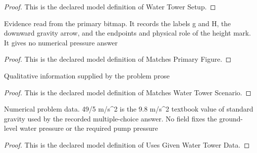 \begin{proof}
  This is the declared model definition of Water Tower Setup.
\end{proof}
\begin{definition}
  \label{def:physics:phyx-mini-0393:phyxminiproblems-problemphyxmini0393-matchesprimaryfigure}
  Evidence read from the primary bitmap. It records the labels g and H, the downward gravity arrow, and the endpoints and physical role of the height mark. It gives no numerical pressure answer
\end{definition}
\begin{proof}
  This is the declared model definition of Matches Primary Figure.
\end{proof}
\begin{definition}
  \label{def:physics:phyx-mini-0393:phyxminiproblems-problemphyxmini0393-matcheswatertowerscenario}
  Qualitative information supplied by the problem prose
\end{definition}
\begin{proof}
  This is the declared model definition of Matches Water Tower Scenario.
\end{proof}
\begin{definition}
  \label{def:physics:phyx-mini-0393:phyxminiproblems-problemphyxmini0393-usesgivenwatertowerdata}
  Numerical problem data. 49/5 m/s\textasciicircum{}2 is the 9.8 m/s\textasciicircum{}2 textbook value of standard gravity used by the recorded multiple-choice answer. No field fixes the ground-level water pressure or the required pump pressure
\end{definition}
\begin{proof}
  This is the declared model definition of Uses Given Water Tower Data.
\end{proof}
